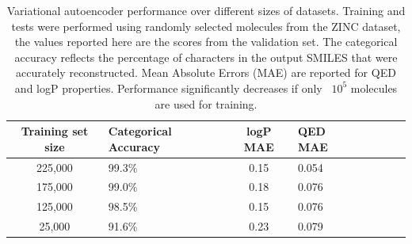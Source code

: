 \begin{table}[h]
\centering
\caption{ Variational autoencoder performance over different sizes of datasets. Training and tests were performed using randomly selected molecules from the ZINC dataset, the values reported here are the scores from the validation set. The categorical accuracy reflects the percentage of characters in the output SMILES that were accurately reconstructed. Mean Absolute Errors (MAE) are reported for QED and logP properties. Performance significantly decreases if only ~$10^5$ molecules are used for training.}
\begin{tabular}{cp{2cm}cp{2cm}cp{2cm}cp{2cm}}
\hline
Training set size &  Categorical Accuracy & logP MAE & QED MAE\\
\hline
225,000 & 99.3\% & 0.15 & 0.054 \\
175,000 & 99.0\% & 0.18 & 0.076 \\
125,000 & 98.5\% & 0.15 & 0.076 \\
25,000 & 91.6\% & 0.23 & 0.079 \\
\hline
\end{tabular}
\label{tab:Accuracy_by_training_size}
\end{table}

